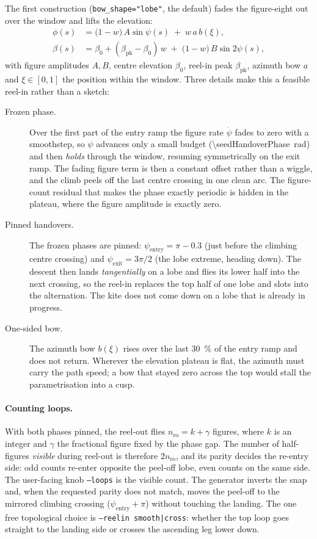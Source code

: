 \documentclass[11pt,a4paper]{article}
\newcommand{\code}[1]{\texttt{\small #1}}
\begin{document}
The first construction (\code{bow\_shape="lobe"}, the default) fades the
figure-eight out over the window and lifts the elevation:
\begin{align}
  \phi(s) &= \bigl(1-w\bigr)\,A\sin\psi(s) \;+\; w\,a\,b(\xi), \\
  \beta(s) &= \beta_0 + (\beta_\mathrm{pk}-\beta_0)\,w \;+\; \bigl(1-w\bigr)\,B\sin2\psi(s),
\end{align}
with figure amplitudes $A,B$, centre elevation $\beta_0$, reel-in peak
$\beta_\mathrm{pk}$, azimuth bow $a$ and $\xi\in[0,1]$ the position within the
window. Three details make this a feasible reel-in rather than a sketch:
\begin{description}
  \item[Frozen phase.] Over the first part of the entry ramp the figure rate
        $\dot\psi$ fades to zero with a smoothstep, so $\psi$ advances only a
        small budget (\SI{\seedHandoverPhase}{rad}) and then \emph{holds} through the window,
        resuming symmetrically on the exit ramp. The fading figure term is
        then a constant offset rather than a wiggle, and the climb peels off
        the last centre crossing in one clean arc. The figure-count residual
        that makes the phase exactly periodic is hidden in the plateau, where
        the figure amplitude is exactly zero.
  \item[Pinned handovers.] The frozen phases are pinned:
        $\psi_\mathrm{entry}=\pi-0.3$ (just before the climbing centre
        crossing) and $\psi_\mathrm{exit}=3\pi/2$ (the lobe extreme, heading
        down). The descent then lands \emph{tangentially} on a lobe and flies
        its lower half into the next crossing, so the reel-in replaces the top
        half of one lobe and slots into the alternation. The kite does not
        come down on a lobe that is already in progress.
  \item[One-sided bow.] The azimuth bow $b(\xi)$ rises over the last
        \SI{30}{\percent} of the entry ramp and does not return. Wherever the
        elevation plateau is flat, the azimuth must carry the path speed;
        a bow that stayed zero across the top would stall the parametrisation
        into a cusp.
\end{description}
\paragraph{Counting loops.}
With both phases pinned, the reel-out flies $n_\mathrm{ro}=k+\gamma$ figures,
where $k$ is an integer and $\gamma$ the fractional figure fixed by the
phase gap. The number of half-figures \emph{visible} during reel-out is
therefore $2n_\mathrm{ro}$, and its parity decides the re-entry side: odd counts
re-enter opposite the peel-off lobe, even counts on the same side. The
user-facing knob \code{--loops} is the visible count. The generator inverts the
snap and, when the requested parity does not match, moves the peel-off to the
mirrored climbing crossing ($\psi_\mathrm{entry}+\pi$) without touching the
landing. The one free topological choice is \code{--reelin smooth|cross}:
whether the top loop goes straight to the landing side or crosses the
ascending leg lower down.
\end{document}
